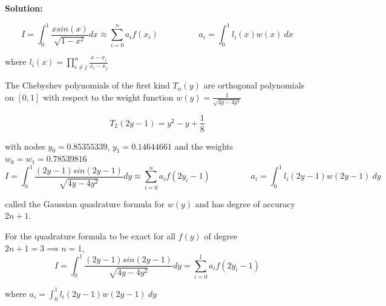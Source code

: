 \documentclass[a4paper,11pt]{report}
\begin{document}
\begin{enumerate}
\begin{itemize}
    \textbf{Solution:}

    \begin{equation*}
    I = \int_{0}^{1} \frac{x sin(x)}{\sqrt{1-x^2}} dx \approx \sum_{i=0}^{n} a_{i} f(x_{i}) \hspace{2cm} a_{i} = \int_{0}^{1} l_{i}(x) w(x)\ dx
    \end{equation*}

    where $l_{i}(x) = \displaystyle \prod_{i \neq j}^{n} \frac{x - x_{j}}{x_{i} - x_{j}}$

    The Chebyshev polynomials of the first kind $T_{n}(y)$ are orthogonal polynomials on $[0, 1]$ with respect to the weight function $w(y) = \displaystyle \frac{1}{\sqrt{4y-4y^2}}$

    \begin{equation*}
    T_{2}(2y-1) = y^{2} - y + \frac{1}{8}
    \end{equation*}
    
    with nodes $y_{0} = 0.85355339$, $y_{1} = 0.14644661$ and the weights $w_{0} = w_{1} = 0.78539816$
    \begin{equation*}
    I = \int_{0}^{1} \frac{(2y-1) sin(2y-1)}{\sqrt{4y-4y^2}} dy \approx \sum_{i=0}^{n} a_{i} f(2y_{i} - 1) \hspace{2cm} a_{i} = \int_{0}^{1} l_{i}(2y-1) w(2y-1)\ dy
    \end{equation*} 

    called the Gaussian quadrature formula for $w(y)$ and has degree of accuracy $2n + 1$.
 
    For the quadrature formula to be exact for all $f(y)$ of degree $2n+1 = 3 \implies n = 1$,
    \begin{equation*}
    I = \int_{0}^{1} \frac{(2y-1) sin(2y-1)}{\sqrt{4y-4y^2}} dy = \sum_{i=0}^{1} a_{i} f(2y_{i} - 1) 
    \end{equation*}

    where $a_{i} = \displaystyle \int_{0}^{1} l_{i}(2y-1) w(2y-1)\ dy$ 


\end{itemize}
\end{enumerate}
\end{document}
